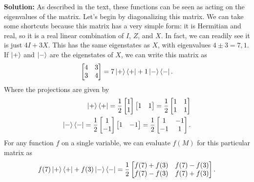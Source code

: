 \documentclass{book}
\begin{document}
    \textbf{Solution:} As described in the text, these functions can be seen as acting on the eigenvalues of the matrix. Let's begin by diagonalizing this matrix. We can take some shortcuts because this matrix has a very simple form: it is Hermitian and real, so it is a real linear combination of $I$, $Z$, and $X$. In fact, we can readily see it is just $4 I + 3 X$. This has the same eigenstates as $X$, with eigenvalues $4 \pm 3 = 7, 1$. If $\ket{+}$ and $\ket{-}$ are the eigenstates of $X$, we can write this matrix as 
    \begin{align}
        \begin{bmatrix}
            4 & 3 \\
            3 & 4
        \end{bmatrix} = 7 \ket{+}\bra{+} + 1 \ket{-}\bra{-}.
    \end{align}
    Where the projections are given by
    \begin{align}
    \begin{aligned}
        \ket{+}\bra{+} = \frac{1}{2} \begin{bmatrix}
            1 \\
            1
        \end{bmatrix} \begin{bmatrix}
            1 & 1
        \end{bmatrix} = \frac{1}{2} \begin{bmatrix}
            1 & 1 \\
            1 & 1
        \end{bmatrix} \\
        \ket{-}\bra{-} = \frac{1}{2} \begin{bmatrix}
            1 \\
            -1
        \end{bmatrix} \begin{bmatrix}
            1 & -1
        \end{bmatrix} = \frac{1}{2} \begin{bmatrix}
            1 & -1 \\
            -1 & 1
        \end{bmatrix}.
    \end{aligned}
    \end{align}
    For any function $f$ on a single variable, we can evaluate $f(M)$ for this particular matrix as 
    \begin{align}
        f(7) \ket{+}\bra{+} + f(3) \ket{-}\bra{-} = \frac{1}{2} \begin{bmatrix}
            f(7) + f(3) & f(7)-f(3) \\
            f(7)-f(3) & f(7) + f(3)
        \end{bmatrix}.
    \end{align}
\end{document}
